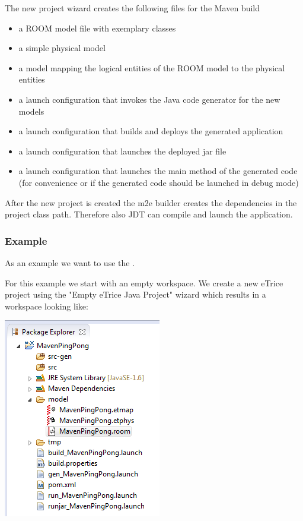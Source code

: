 The \eTrice{} new project wizard creates the following files for the Maven build
\begin{itemize}
\item a ROOM model file with exemplary classes
\item a simple physical model
\item a model mapping the logical entities of the ROOM model to the physical entities
\item a launch configuration that invokes the \eTrice{} Java code generator for the new models
\item a launch configuration that builds and deploys the generated application
\item a launch configuration that launches the deployed jar file
\item a launch configuration that launches the main method of the generated code (for convenience or
if the generated code should be launched in debug mode)
\end{itemize}

After the new project is created the m2e builder creates the dependencies in the project class path.
Therefore also JDT can compile and launch the application.

\subsubsection{Example}

As an example we want to use the .

For this example we start with an empty workspace.
We create a new eTrice project using the "Empty eTrice Java Project" wizard which results in a workspace looking
like:

\includegraphics{images/042-after-project-creation.png}

